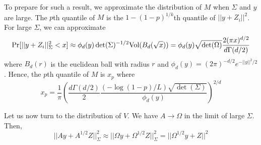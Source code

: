 \documentclass[12pt]{article}
\begin{document}
To prepare for such a result, we approximate the distribution of $M$ when $\Sigma$ and $y$ are large.
The $p$th quantile of $M$ is the $1-(1-p)^{1/k}$th quantile of $||y + Z_i||^2$.
For large $\Sigma$, we can approximate
\[
\Pr[||y+ Z_i||^2_\Sigma < x] \approx \phi_d(y) \det(\Sigma)^{-1/2}\text{Vol}(B_d(\sqrt{x})) = 
\phi_d(y) \sqrt{\det(\Omega)} \frac{2(\pi x)^{d/2}}{d\Gamma(d/2)}
\]
where $B_d(r)$ is the euclidean ball with radius $r$ and $\phi_d(y) = (2\pi)^{-d/2} e^{-||y||^2/2}$.
Hence, the $p$th quantile of $M$ is $x_p$ where
\[
x_p = \frac{1}{\pi}\left(
\frac{d\Gamma(d/2)}{2} \frac{(-\log(1-p)/L)\sqrt{\det(\Sigma)}}{\phi_d(y)}
\right)^{2/d}
\]


Let us now turn to the distribution of $V$.
We have $A \to \Omega$ in the limit of large $\Sigma$.
Then,
\[
||Ay + A^{1/2}Z||^2_\Sigma \approx ||\Omega y + \Omega^{1/2}Z||^2_\Sigma = ||\Omega^{1/2} y + Z||^2
\]
\end{document}
